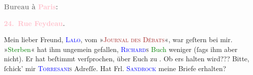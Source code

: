            \pstart
           \begin{otherlanguage}{french}\textcolor{gray}{\textbf{\textbf{Bureau à \textcolor{pink}{Paris}{}\ledrightnote{\textcolor{pink}{Paris}}:}}}\end{otherlanguage}\pend
           \pstart
           \begin{otherlanguage}{french}\textcolor{gray}{\textbf{\textbf{\textcolor{pink}{24. Rue Feydeau}{}\ledrightnote{\textcolor{pink}{rue Feydeau}}.}}}\end{otherlanguage}\pend
           \pstart\center{}Mein lieber Freund,\pend\pstart
           \textsc{\textcolor{blue}{Lalo}{}\ledrightnote{\textcolor{blue}{Pierre Lalo}}}, vom »\textsc{\textcolor{brown}{Journal des Débats}{}\ledrightnote{\textcolor{brown}{Journal des débats}}}«, war geſtern bei mir. »\textcolor{green}{Sterben}{}\ledrightnote{\textcolor{green}{Sterben. Novelle}}« hat ihm ungemein gefallen, \textsc{\textcolor{blue}{Richard}{}\ledrightnote{\textcolor{blue}{Richard Beer-Hofmann}}s}{ }\textcolor{green}{Buch}{} weniger
               (ſags ihm aber nicht). Er hat beſtimmt verſprochen, über Euch zu \label{K_L02727-1v}\label{K_L02727-1h}. Ob ers halten wird???\pend
           \pstart
           Bitte, ſchick’ mir \textsc{\textcolor{blue}{Torresani}{}\ledrightnote{\textcolor{blue}{Carl von Torresani-Lanzenfeld}}s} Adreſſe.\pend
           \pstart
           Hat Frl. \textsc{\textcolor{blue}{Sandrock}{}\ledrightnote{\textcolor{blue}{Adele Sandrock}}} meine Briefe erhalten?\pend
           \pstart

